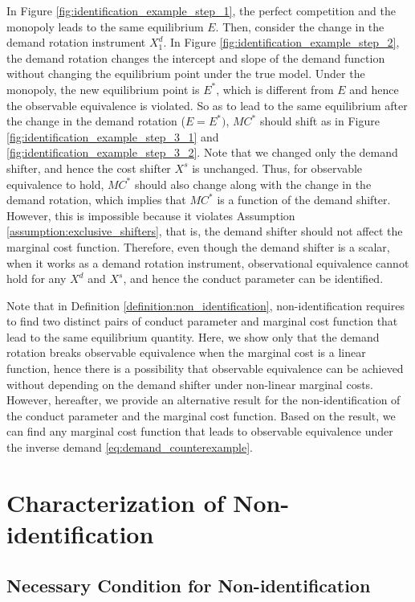 \documentclass[11pt, a4paper]{article}
\theoremstyle{remark}
\begin{document}
In Figure \ref{fig:identification_example_step_1}, the perfect competition and the monopoly leads to the same equilibrium $E$.
Then, consider the change in the demand rotation instrument $X^{d}_1$.
In Figure \ref{fig:identification_example_step_2}, the demand rotation changes the intercept and slope of the demand function without changing the equilibrium point under the true model.
Under the monopoly, the new equilibrium point is $E^{*}$, which is different from $E$ and hence the observable equivalence is violated.
So as to lead to the same equilibrium after the change in the demand rotation ($E = E^{*})$, $MC^{*}$ should shift as in Figure \ref{fig:identification_example_step_3_1} and \ref{fig:identification_example_step_3_2}.
Note that we changed only the demand shifter, and hence the cost shifter $X^{s}$ is unchanged.
Thus, for observable equivalence to hold, $MC^{*}$ should also change along with the change in the demand rotation, which implies that $MC^{*}$ is a function of the demand shifter.
However, this is impossible because it violates Assumption \ref{assumption:exclusive_shifters}, that is, the demand shifter should not affect the marginal cost function.
Therefore, even though the demand shifter is a scalar, when it works as a demand rotation instrument, observational equivalence cannot hold for any $X^{d}$ and $X^{s}$, and hence the conduct parameter can be identified.


Note that in Definition \ref{definition:non_identification}, non-identification requires to find two distinct pairs of conduct parameter and marginal cost function that lead to the same equilibrium quantity.
Here, we show only that the demand rotation breaks observable equivalence when the marginal cost is a linear function, hence there is a possibility that observable equivalence can be achieved without depending on the demand shifter under non-linear marginal costs.
However, hereafter, we provide an alternative result for the non-identification of the conduct parameter and the marginal cost function. 
Based on the result, we can find any marginal cost function that leads to observable equivalence under the inverse demand \eqref{eq:demand_counterexample}.


\section{Characterization of Non-identification}\label{sec:nonidentification_characterization}

\subsection{Necessary Condition for Non-identification}
\end{document}

